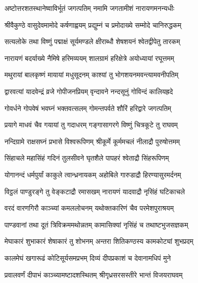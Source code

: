 
\twolineshloka
{अष्टोत्तरशतस्थानेष्वाविर्भूतं जगत्पतिम्}
{नमामि जगतामीशं नारायणमनन्यधीः}

\twolineshloka
{श्रीवैकुण्ठे वासुदेवमामोदे कर्षणाह्वयम्}
{प्रद्युम्नं च प्रमोदाख्ये सम्मोदे चानिरुद्धकम्}

\twolineshloka
{सत्यलोके तथा विष्णुं पद्माक्षं सूर्यमण्डले}
{क्षीराब्धौ शेषशयनं श्वेतद्वीपेतु तारकम्}

\twolineshloka
{नारायणं बदर्याख्ये नैमिषे हरिमव्ययम्}
{शालग्रामं हरिक्षेत्रे अयोध्यायां रघूत्तमम्}

\twolineshloka
{मथुरायां बालकृष्णं मायायां मधुसूदनम्}
{काश्यां तु भोगशयनमवन्त्यामवनीपतिम्}

\twolineshloka
{द्वारवत्यां यादवेन्द्रं व्रजे गोपीजनप्रियम्}
{वृन्दावने नन्दसूनुं गोविन्दं कालियह्रदे}

\twolineshloka
{गोवर्धने गोपवेषं भवघ्नं भक्तवत्सलम्}
{गोमन्तपर्वते शौरिं हरिद्वारे जगत्पतिम्}

\twolineshloka
{प्रयागे माधवं चैव गयायां तु गदाधरम्}
{गङ्गासागरगे विष्णुं चित्रकूटे तु राघवम्}

\twolineshloka
{नन्दिग्रामे राक्षसघ्नं प्रभासे विश्वरूपिणम्}
{श्रीकूर्मे कूर्ममचलं नीलाद्रौ पुरुषोत्तमम्}

\twolineshloka
{सिंहाचले महासिंहं गदिनं तुलसीवने}
{घृतशैले पापहरं श्वेताद्रौ सिंहरूपिणम्}

\twolineshloka
{योगानन्दं धर्मपुर्यां काकुले त्वान्ध्रनायकम्}
{अहोबिले गारुडाद्रौ हिरण्यासुरमर्दनम्}

\twolineshloka
{विट्ठलं पाण्डुरङ्गे तु वेङ्कटाद्रौ रमासखम्}
{नारायणं यादवाद्रौ नृसिंहं घटिकाचले}

\twolineshloka
{वरदं वारणगिरौ काञ्च्यां कमललोचनम्}
{यथोक्तकारिणं चैव परमेशपुराश्रयम्}

\twolineshloka
{पाण्डवानां तथा दूतं त्रिविक्रममथोन्नतम्}
{कामासिक्यां नृसिंहं च तथाष्टभुजसज्ञकम्}

\twolineshloka
{मेघाकारं शुभाकारं शेषाकारं तु शोभनम्}
{अन्तरा शितिकण्ठस्य कामकोट्यां शुभप्रदम्}

\twolineshloka
{कालमेघं खगारूढं कोटिसूर्यसमप्रभम्}
{दिव्यं दीपप्रकाशं च देवानामधिपं मुने}

\twolineshloka
{प्रवालवर्णं दीपाभं काञ्च्यामष्टादशस्थितम्}
{श्रीगृध्रसरसस्तीरे भान्तं विजयराघवम्}

